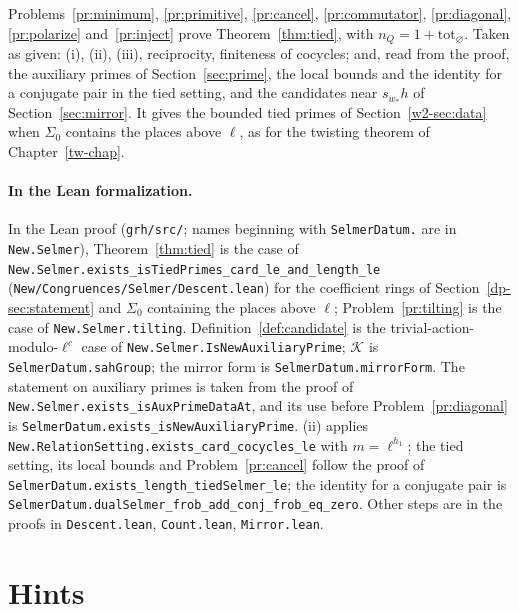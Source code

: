 \documentclass[reqno]{amsart}
\newcounter{chap}
\theoremstyle{definition}
\theoremstyle{plain}
\newcommand{\tot}{\mathrm{tot}}
\newcommand{\Kc}{\mathcal{K}}
\begin{document}
Problems~\ref{pr:minimum}, \ref{pr:primitive}, \ref{pr:cancel}, \ref{pr:commutator}, \ref{pr:diagonal}, \ref{pr:polarize} and~\ref{pr:inject} prove Theorem~\ref{thm:tied}, with \(n_Q = 1 + \tot_\varnothing\).  Taken as given: (i), (ii), (iii), reciprocity, finiteness of cocycles; and, read from the proof, the auxiliary primes of Section~\ref{sec:prime}, the local bounds and the identity for a conjugate pair in the tied setting, and the candidates near \(s_{w_*}h\) of Section~\ref{sec:mirror}.  It gives the bounded tied primes of Section~\ref{w2-sec:data} when \(\Sigma_0\) contains the places above \(\ell\), as for the twisting theorem of Chapter~\ref{tw-chap}.

\paragraph{In the Lean formalization.}
\begin{sloppypar}
In the Lean proof \cite{GL} (\nolinkurl{grh/src/}; names beginning with \texttt{SelmerDatum.} are in \texttt{New.Selmer}), Theorem~\ref{thm:tied} is the case of \texttt{New.Selmer.exists\_isTiedPrimes\_card\_le\_and\_length\_le} (\nolinkurl{New/Congruences/Selmer/Descent.lean}) for the coefficient rings of Section~\ref{dp-sec:statement} and \(\Sigma_0\) containing the places above \(\ell\); Problem~\ref{pr:tilting} is the case of \texttt{New.Selmer.tilting}.  Definition~\ref{def:candidate} is the trivial-action-modulo-\(\ell^c\) case of \texttt{New.Selmer.IsNewAuxiliaryPrime}; \(\Kc\) is \texttt{SelmerDatum.sahGroup}; the mirror form is \texttt{SelmerDatum.mirrorForm}.  The statement on auxiliary primes is taken from the proof of \texttt{New.Selmer.exists\_isAuxPrimeDataAt}, and its use before Problem~\ref{pr:diagonal} is \texttt{SelmerDatum.exists\_isNewAuxiliaryPrime}.  (ii) applies \texttt{New.RelationSetting.exists\_card\_cocycles\_le} with \(m = \ell^{h_1}\); the tied setting, its local bounds and Problem~\ref{pr:cancel} follow the proof of \texttt{SelmerDatum.exists\_length\_tiedSelmer\_le}; the identity for a conjugate pair is \texttt{SelmerDatum.dualSelmer\_frob\_add\_conj\_frob\_eq\_zero}.  Other steps are in the proofs in \nolinkurl{Descent.lean}, \nolinkurl{Count.lean}, \nolinkurl{Mirror.lean}.
\end{sloppypar}

\section*{Hints}
\end{document}
